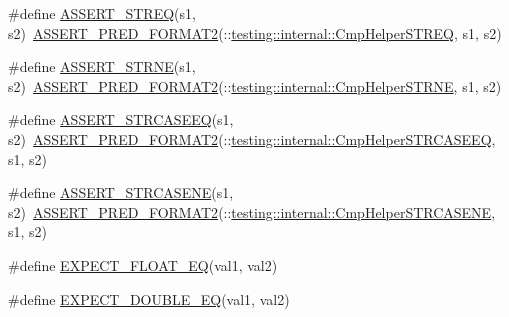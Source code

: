 \begin{DoxyCompactItemize}
\item 
\#define \mbox{\hyperlink{googletest-master_2googletest_2include_2gtest_2gtest_8h_a74f4189ea570bab9a65d47104659ef9c}{A\+S\+S\+E\+R\+T\+\_\+\+S\+T\+R\+EQ}}(s1,  s2)~\mbox{\hyperlink{_obj__test_2lib_2googletest-release-1_88_81_2googletest_2include_2gtest_2gtest__pred__impl_8h_ac452685a1a98ea3d96eb956a062ee210}{A\+S\+S\+E\+R\+T\+\_\+\+P\+R\+E\+D\+\_\+\+F\+O\+R\+M\+A\+T2}}(\+::\mbox{\hyperlink{namespacetesting_1_1internal_a711a396ed8f636ecd14a850a89d181b6}{testing\+::internal\+::\+Cmp\+Helper\+S\+T\+R\+EQ}}, s1, s2)
\item 
\#define \mbox{\hyperlink{googletest-master_2googletest_2include_2gtest_2gtest_8h_a3d679660ac1b2f9f6e6c7608452af923}{A\+S\+S\+E\+R\+T\+\_\+\+S\+T\+R\+NE}}(s1,  s2)~\mbox{\hyperlink{_obj__test_2lib_2googletest-release-1_88_81_2googletest_2include_2gtest_2gtest__pred__impl_8h_ac452685a1a98ea3d96eb956a062ee210}{A\+S\+S\+E\+R\+T\+\_\+\+P\+R\+E\+D\+\_\+\+F\+O\+R\+M\+A\+T2}}(\+::\mbox{\hyperlink{namespacetesting_1_1internal_af2d31c77ce73e1003a64bd7ca3564bbe}{testing\+::internal\+::\+Cmp\+Helper\+S\+T\+R\+NE}}, s1, s2)
\item 
\#define \mbox{\hyperlink{googletest-master_2googletest_2include_2gtest_2gtest_8h_a58847dd696200a3268361401dfcd0fa0}{A\+S\+S\+E\+R\+T\+\_\+\+S\+T\+R\+C\+A\+S\+E\+EQ}}(s1,  s2)~\mbox{\hyperlink{_obj__test_2lib_2googletest-release-1_88_81_2googletest_2include_2gtest_2gtest__pred__impl_8h_ac452685a1a98ea3d96eb956a062ee210}{A\+S\+S\+E\+R\+T\+\_\+\+P\+R\+E\+D\+\_\+\+F\+O\+R\+M\+A\+T2}}(\+::\mbox{\hyperlink{namespacetesting_1_1internal_a30dfeb01f1bc8087c7d05205d5fa75c1}{testing\+::internal\+::\+Cmp\+Helper\+S\+T\+R\+C\+A\+S\+E\+EQ}}, s1, s2)
\item 
\#define \mbox{\hyperlink{googletest-master_2googletest_2include_2gtest_2gtest_8h_ac3d2c3836b103068a050f32585b2aaad}{A\+S\+S\+E\+R\+T\+\_\+\+S\+T\+R\+C\+A\+S\+E\+NE}}(s1,  s2)~\mbox{\hyperlink{_obj__test_2lib_2googletest-release-1_88_81_2googletest_2include_2gtest_2gtest__pred__impl_8h_ac452685a1a98ea3d96eb956a062ee210}{A\+S\+S\+E\+R\+T\+\_\+\+P\+R\+E\+D\+\_\+\+F\+O\+R\+M\+A\+T2}}(\+::\mbox{\hyperlink{namespacetesting_1_1internal_a7e31d489f06ab8f6a81a7729f0c377e7}{testing\+::internal\+::\+Cmp\+Helper\+S\+T\+R\+C\+A\+S\+E\+NE}}, s1, s2)
\item 
\#define \mbox{\hyperlink{googletest-master_2googletest_2include_2gtest_2gtest_8h_a981e552322fb084042d02d6dfa9860ca}{E\+X\+P\+E\+C\+T\+\_\+\+F\+L\+O\+A\+T\+\_\+\+EQ}}(val1,  val2)
\item 
\#define \mbox{\hyperlink{googletest-master_2googletest_2include_2gtest_2gtest_8h_ab4852f9430cf656690256ea7fe6323b8}{E\+X\+P\+E\+C\+T\+\_\+\+D\+O\+U\+B\+L\+E\+\_\+\+EQ}}(val1,  val2)

\end{DoxyCompactItemize}
